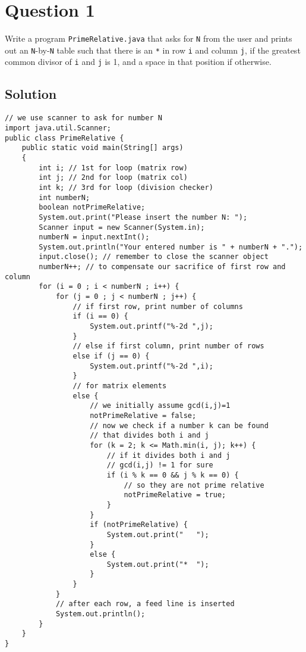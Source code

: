 \documentclass[12pt,letterpaper,twoside]{article}
\begin{document}


\section*{Question 1}

Write a program \texttt{PrimeRelative.java} that asks for \texttt{N} from the user and prints out an \texttt{N}-by-\texttt{N} table such that there is an \texttt{*} in row \texttt{i} and column \texttt{j}, if the greatest common divisor of \texttt{i} and \texttt{j} is 1, and a space in that position if otherwise.

\subsection*{Solution}

\lstset{language=Java,tabsize=2}
\begin{lstlisting}
// we use scanner to ask for number N
import java.util.Scanner;
public class PrimeRelative {
	public static void main(String[] args)
	{
		int i; // 1st for loop (matrix row)
		int j; // 2nd for loop (matrix col)
		int k; // 3rd for loop (division checker)
		int numberN;
		boolean notPrimeRelative;
		System.out.print("Please insert the number N: ");
		Scanner input = new Scanner(System.in);
		numberN = input.nextInt();
		System.out.println("Your entered number is " + numberN + ".");
		input.close(); // remember to close the scanner object
		numberN++; // to compensate our sacrifice of first row and column
		for (i = 0 ; i < numberN ; i++) {
			for (j = 0 ; j < numberN ; j++) {
				// if first row, print number of columns
				if (i == 0) {
					System.out.printf("%-2d ",j);
				}
				// else if first column, print number of rows
				else if (j == 0) {
					System.out.printf("%-2d ",i);
				}
				// for matrix elements
				else {
					// we initially assume gcd(i,j)=1
					notPrimeRelative = false;
					// now we check if a number k can be found
					// that divides both i and j
					for (k = 2; k <= Math.min(i, j); k++) {
						// if it divides both i and j
						// gcd(i,j) != 1 for sure
						if (i % k == 0 && j % k == 0) {
							// so they are not prime relative
							notPrimeRelative = true;
						}
					}
					if (notPrimeRelative) {
						System.out.print("   ");
					}
					else {
						System.out.print("*  ");
					}
				}
			}
			// after each row, a feed line is inserted
			System.out.println();
		}
	}
}
\end{lstlisting}
\newpage
\end{document}
